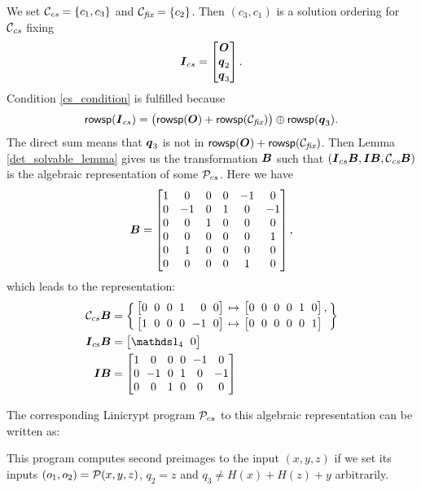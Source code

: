 We set $\Ccs = \{ c_1, c_3 \}$ and $\Cfix = \{c_2\}$.
Then $(c_3, c_1)$ is a solution ordering for $\Ccs$ fixing 
\[
\I_{cs} = \begin{bmatrix}\O \\ \vq_2 \\ \vq_3 \end{bmatrix}.
\]
Condition \eqref{cs_condition} is fulfilled because
\[
\rowsp(\I_{cs}) = \big(\rowsp(\O) + \rowsp(\Cfix)\big) \oplus \rowsp(\vq_3).
\]
The direct sum means that $\vq_3$ is not in $\rowsp(\O) + \rowsp(\Cfix)$.
Then Lemma \ref{det_solvable_lemma} gives us the transformation $\B$
such that $(\I_{cs} \B, \I \B, \Ccs \B)$
is the algebraic representation of some $\P_{cs}$.
Here we have
\[
\B = 
\begin{bmatrix}
1 & 0 & 0 & 0 &-1 & 0 \\
0 &-1 & 0 & 1 & 0 &-1 \\
0 & 0 & 1 & 0 & 0 & 0 \\
0 & 0 & 0 & 0 & 0 & 1 \\
0 & 1 & 0 & 0 & 0 & 0 \\
0 & 0 & 0 & 0 & 1 & 0
\end{bmatrix},
\]
which leads to the representation:
\begin{align*}
    \C_{cs} \B &= \left\{
        \arraycolsep=2pt
        \begin{array}{l l l}
            \m{0 & 0 & 0 & 1 &\phantom{-}0 & 0} & \mapsto & \m{0 & 0 & 0 & 0 & 1 & 0}, \\[2pt]
            \m{1 & 0 & 0 & 0 &-1 & 0} & \mapsto & \m{0 & 0 & 0 & 0 & 0 & 1}
        \end{array}
    \right\} \\
    \I_\textrm{cs} \B &= \m{\Id_4 & 0} \\
    \I \B &= \m{
1 & 0 & 0 & 0 &-1 & 0 \\
0 &-1 & 0 & 1 & 0 &-1 \\
0 & 0 & 1 & 0 & 0 & 0
    }    
\end{align*}

The corresponding Linicrypt program $\P_{cs}$ to this algebraic representation can be written as:

This program computes second preimages to the input $(x,y,z)$
if we set its inputs $(o_1, o_2) = \P(x,y,z)$, $q_2 = z$ and $q_3 \neq H(x) + H(z) + y$ arbitrarily.
